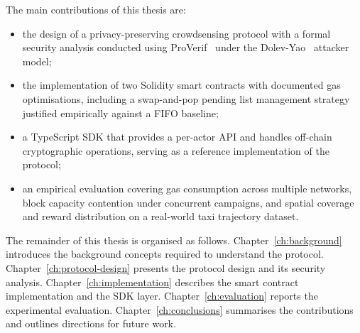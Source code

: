 The main contributions of this thesis are:
\begin{itemize}
    \item the design of a privacy-preserving crowdsensing protocol with a
    formal security analysis conducted using ProVerif~\cite{blanchet2001proverif} under the Dolev-Yao~\cite{dolev1983security}
    attacker model;
    \item the implementation of two Solidity smart contracts with documented
    gas optimisations, including a swap-and-pop pending list management
    strategy justified empirically against a FIFO baseline;
    \item a TypeScript SDK that provides a per-actor API and handles
    off-chain cryptographic operations, serving as a reference implementation
    of the protocol;
    \item an empirical evaluation covering gas consumption across multiple
    networks, block capacity contention under concurrent campaigns, and
    spatial coverage and reward distribution on a real-world taxi trajectory
    dataset.
\end{itemize}

The remainder of this thesis is organised as follows.
Chapter~\ref{ch:background} introduces the background concepts required
to understand the protocol.
Chapter~\ref{ch:protocol-design} presents the protocol design and its
security analysis.
Chapter~\ref{ch:implementation} describes the smart contract implementation
and the SDK layer.
Chapter~\ref{ch:evaluation} reports the experimental evaluation.
Chapter~\ref{ch:conclusions} summarises the contributions and outlines
directions for future work.